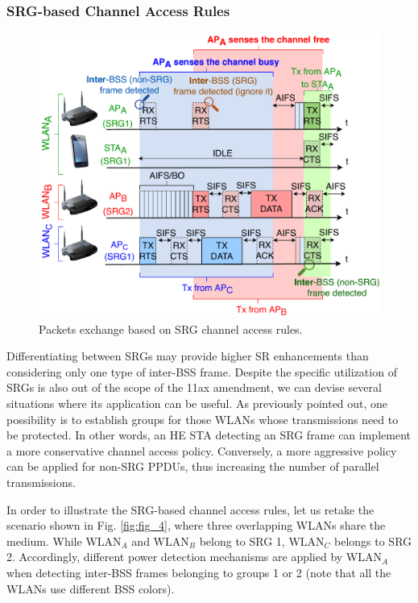 \documentclass[comsoc]{IEEEtran}
\begin{document}
	\subsubsection{SRG-based Channel Access Rules}
	\label{section:srg_channel_access}
	\begin{figure}[ht!]
		\centering
		\includegraphics[width=\columnwidth]{fig_7}
		\caption{Packets exchange based on SRG channel access rules.}
		\label{fig:srg_channel_access}
	\end{figure}
	
	Differentiating between SRGs may provide higher SR enhancements than considering only one type of inter-BSS frame. Despite the specific utilization of SRGs is also out of the scope of the 11ax amendment, we can devise several situations where its application can be useful. As previously pointed out, one possibility is to establish groups for those WLANs whose transmissions need to be protected. In other words, an HE STA detecting an SRG frame can implement a more conservative channel access policy. Conversely, a more aggressive policy can be applied for non-SRG PPDUs, thus increasing the number of parallel transmissions. 
	
	In order to illustrate the SRG-based channel access rules, let us retake the scenario shown in Fig. \ref{fig:fig_4}, where three overlapping WLANs share the medium. While $\text{WLAN}_A$ and $\text{WLAN}_B$ belong to SRG 1, $\text{WLAN}_C$ belongs to SRG 2. Accordingly, different power detection mechanisms are applied by $\text{WLAN}_A$ when detecting inter-BSS frames belonging to groups 1 or 2 (note that all the WLANs use different BSS colors). 
	
\end{document}
